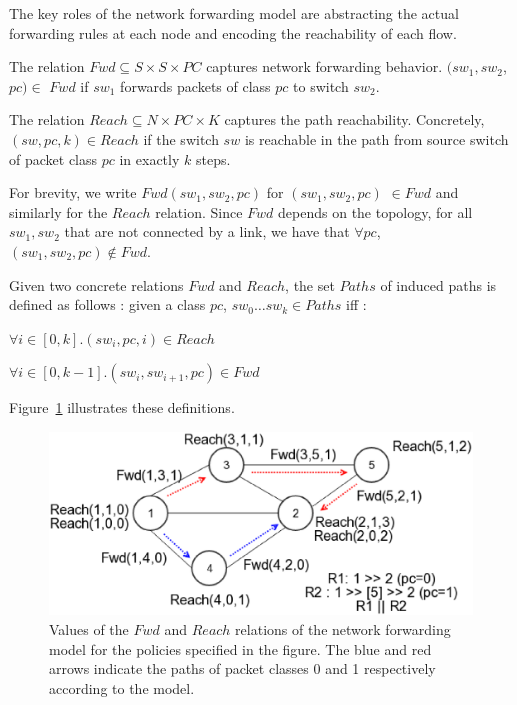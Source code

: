 The key roles of the network forwarding model are abstracting the actual forwarding rules at each node and encoding the reachability of each flow. 
\begin{mydef}
\label{def:fwd}
The relation $Fwd \subseteq S \times S \times PC $ captures network forwarding behavior. 
$(sw_1, sw_2$, $pc)\in$ $Fwd$ if 
$sw_1$ forwards packets of class $pc$ to switch $sw_2$. 
\end{mydef}
\begin{mydef}
\label{def:reach}
	The relation $Reach \subseteq N \times PC \times K$ captures the path reachability.   
	Concretely, $(sw, pc, k)\in Reach$ if 
	the switch $sw$ is reachable in the path from source switch of packet class $pc$ in exactly $k$ steps.  
\end{mydef}
For brevity, we write $Fwd(sw_1, sw_2, pc)$ for $(sw_1, sw_2, pc) $ $\in Fwd$ and similarly for the $Reach$ relation. 
Since $Fwd$ depends on the topology,
for all $sw_1, sw_2$ that are not connected by a link, 
we have that $\forall pc$, $(sw_1,sw_2,pc) \notin Fwd$. 

Given two concrete relations $Fwd$ and $Reach$, 
the set $Paths$ of induced paths is defined as follows :
given a class $pc$,  $sw_0 \ldots sw_k \in Paths$ iff : 
\begin{compactenumerate}
	\item $\forall i \in [0,k]. (sw_i, pc, i) \in Reach$
	\item $\forall i \in [0, k - 1]. (sw_i, sw_{i+1}, pc) \in Fwd$
\end{compactenumerate}
Figure~\ref{fig:model} illustrates these definitions.

\begin{figure}[!thb]
	\centering
	\includegraphics[width=0.8\columnwidth]{figures/network-model-example.eps}
	\caption{Values of the $Fwd$ and $Reach$ relations of the network forwarding model
		 for the policies specified in the figure. The blue and red arrows indicate the 
		 paths of packet classes 0 and 1 respectively according to the model.}
	\label{fig:model}
\end{figure}

